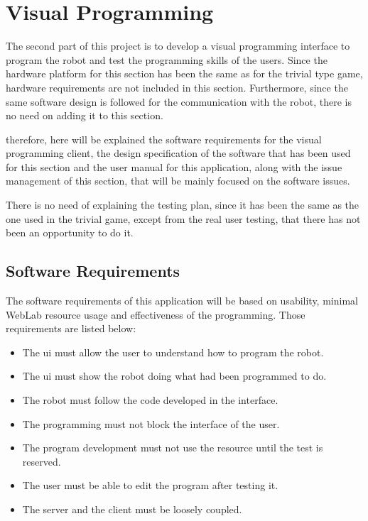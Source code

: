 \clearpage
\section{Visual Programming}

The second part of this project is to develop a visual programming interface to program the robot
and test the programming skills of the users. Since the hardware platform for this section has been
the same as for the trivial type game, hardware requirements are not included in this section.
Furthermore, since the same software design is followed for the communication with the robot, there
is no need on adding it to this section.

therefore, here will be explained the software requirements for the visual programming client, the
design specification of the software that has been used for this section and the user manual for
this application, along with the issue management of this section, that will be mainly focused on
the software issues.

There is no need of explaining the testing plan, since it has been the same as the one used in the
trivial game, except from the real user testing, that there has not been an opportunity to do it.

\subsection{Software Requirements}

The software requirements of this application will be based on usability, minimal WebLab resource
usage and effectiveness of the programming. Those requirements are listed below:

\begin{itemize}

	\item The \acrlong{ui} must allow the user to understand how to program the robot.
	\item The \acrlong{ui} must show the robot doing what had been programmed to do.
	\item The robot must follow the code developed in the interface.
	\item The programming must not block the interface of the user.
	\item The program development must not use the resource until the test is reserved.
	\item The user must be able to edit the program after testing it.
	\item The server and the client must be loosely coupled.

\end{itemize}

